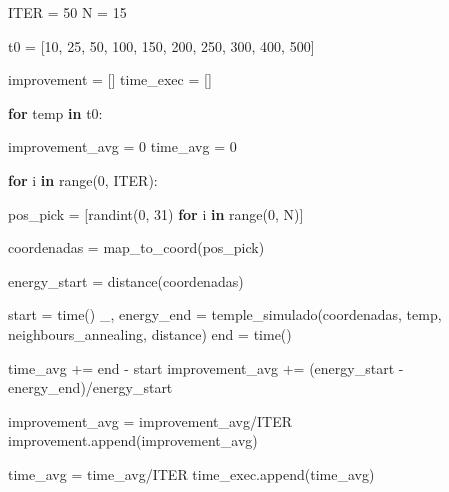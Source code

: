 \documentclass[
]{article}
\newenvironment{Shaded}{}{}
\newcommand{\BuiltInTok}[1]{#1}
\newcommand{\ControlFlowTok}[1]{\textcolor[rgb]{0.00,0.44,0.13}{\textbf{#1}}}
\newcommand{\DecValTok}[1]{\textcolor[rgb]{0.25,0.63,0.44}{#1}}
\newcommand{\KeywordTok}[1]{\textcolor[rgb]{0.00,0.44,0.13}{\textbf{#1}}}
\newcommand{\NormalTok}[1]{#1}
\newcommand{\OperatorTok}[1]{\textcolor[rgb]{0.40,0.40,0.40}{#1}}
\begin{document}
\begin{Shaded}
\begin{Highlighting}[]
\NormalTok{ITER }\OperatorTok{=} \DecValTok{50}
\NormalTok{N }\OperatorTok{=} \DecValTok{15}

\NormalTok{t0 }\OperatorTok{=}\NormalTok{ [}\DecValTok{10}\NormalTok{, }\DecValTok{25}\NormalTok{, }\DecValTok{50}\NormalTok{, }\DecValTok{100}\NormalTok{, }\DecValTok{150}\NormalTok{, }\DecValTok{200}\NormalTok{, }\DecValTok{250}\NormalTok{, }\DecValTok{300}\NormalTok{, }\DecValTok{400}\NormalTok{, }\DecValTok{500}\NormalTok{]}

\NormalTok{improvement }\OperatorTok{=}\NormalTok{ []}
\NormalTok{time_exec }\OperatorTok{=}\NormalTok{ []}

\ControlFlowTok{for}\NormalTok{ temp }\KeywordTok{in}\NormalTok{ t0:}
    
\NormalTok{    improvement_avg }\OperatorTok{=} \DecValTok{0}
\NormalTok{    time_avg }\OperatorTok{=} \DecValTok{0}

    \ControlFlowTok{for}\NormalTok{ i }\KeywordTok{in} \BuiltInTok{range}\NormalTok{(}\DecValTok{0}\NormalTok{, ITER):}
        
\NormalTok{        pos_pick }\OperatorTok{=}\NormalTok{ [randint(}\DecValTok{0}\NormalTok{, }\DecValTok{31}\NormalTok{) }\ControlFlowTok{for}\NormalTok{ i }\KeywordTok{in} \BuiltInTok{range}\NormalTok{(}\DecValTok{0}\NormalTok{, N)]}

\NormalTok{        coordenadas }\OperatorTok{=}\NormalTok{ map_to_coord(pos_pick)}

\NormalTok{        energy_start }\OperatorTok{=}\NormalTok{ distance(coordenadas)}

\NormalTok{        start }\OperatorTok{=}\NormalTok{ time()}
\NormalTok{        _, energy_end }\OperatorTok{=}\NormalTok{ temple_simulado(coordenadas, temp, neighbours_annealing, distance)}
\NormalTok{        end }\OperatorTok{=}\NormalTok{ time()}

\NormalTok{        time_avg }\OperatorTok{+=}\NormalTok{ end }\OperatorTok{-}\NormalTok{ start}
\NormalTok{        improvement_avg }\OperatorTok{+=}\NormalTok{ (energy_start }\OperatorTok{-}\NormalTok{ energy_end)}\OperatorTok{/}\NormalTok{energy_start}

\NormalTok{    improvement_avg }\OperatorTok{=}\NormalTok{ improvement_avg}\OperatorTok{/}\NormalTok{ITER}
\NormalTok{    improvement.append(improvement_avg)}

\NormalTok{    time_avg }\OperatorTok{=}\NormalTok{ time_avg}\OperatorTok{/}\NormalTok{ITER}
\NormalTok{    time_exec.append(time_avg)}
\end{Highlighting}
\end{Shaded}
\end{document}
